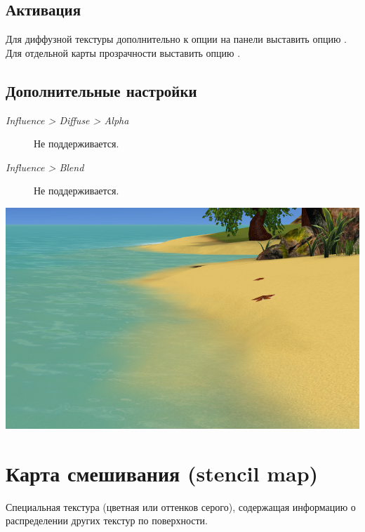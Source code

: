 \documentclass[a4paper,12pt,oneside]{sphinxmanual}
\begin{document}
\subsection{Активация}
\label{textures:id12}
Для диффузной текстуры дополнительно к опции  на панели  выставить опцию . Для отдельной карты прозрачности выставить опцию .


\subsection{Дополнительные настройки}
\label{textures:id13}\begin{description}
\item[{\emph{Influence \textgreater{} Diffuse \textgreater{} Alpha}}] \leavevmode
Не поддерживается.

\item[{\emph{Influence \textgreater{} Blend}}] \leavevmode
Не поддерживается.

\end{description}

{\hfill\includegraphics[width=1.000\linewidth]{alpha_map_water.jpg}\hfill}

\begin{DUlineblock}{0em}
\item[] 
\end{DUlineblock}


\section{Карта смешивания (stencil map)}
\label{textures:stencil-map}\label{textures:index-9}
Специальная текстура (цветная или оттенков серого), содержащая информацию о распределении других текстур по поверхности.
\end{document}
